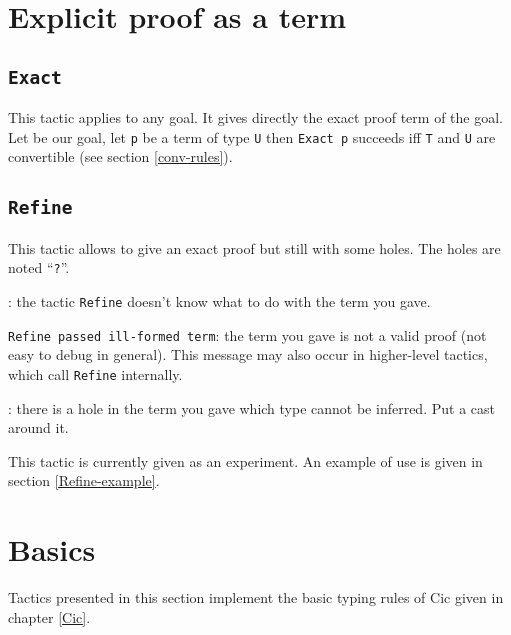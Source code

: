 \section{Explicit proof as a term}

\subsection{\tt Exact \term}
\label{Exact}
This tactic applies to any goal. It gives directly the exact proof
term of the goal. Let {\T} be our goal, let {\tt p} be a term of type
{\tt U} then {\tt Exact p} succeeds iff {\tt T} and {\tt U} are
convertible (see section \ref{conv-rules}).

\begin{ErrMsgs}
\item {}
\end{ErrMsgs}


\subsection{\tt Refine \term}
\label{Refine}

This tactic allows to give an exact proof but still with some
holes. The holes are noted ``\texttt{?}''.

\begin{ErrMsgs}
\item {}: 
  the tactic \texttt{Refine} doesn't know what to do
  with the term you gave.
\item \texttt{Refine passed ill-formed term}: the term you gave is not
  a valid proof (not easy to debug in general).
  This message may also occur in higher-level tactics, which call 
  \texttt{Refine} internally.
\item {}: 
  there is a hole in the term you gave
  which type cannot be inferred. Put a cast around it.
\end{ErrMsgs}

This tactic is currently given as an experiment. An example of use is given
in section \ref{Refine-example}.

\section{Basics}
Tactics presented in this section implement the basic typing rules of
{\sc Cic} given in chapter \ref{Cic}.

